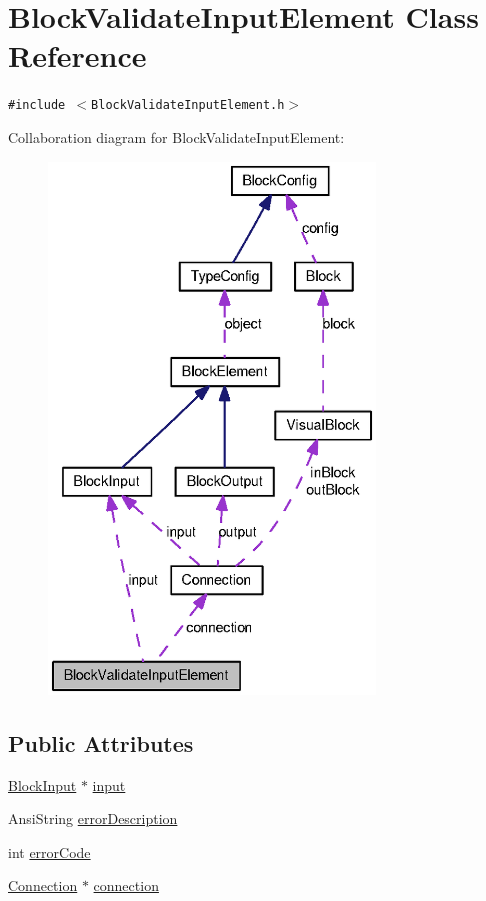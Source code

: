 \hypertarget{classBlockValidateInputElement}{
\section{BlockValidateInputElement Class Reference}
\label{classBlockValidateInputElement}
}
{\tt \#include $<$BlockValidateInputElement.h$>$}

Collaboration diagram for BlockValidateInputElement:\nopagebreak
\begin{figure}[H]
\begin{center}
\leavevmode
\includegraphics[height=400pt]{classBlockValidateInputElement__coll__graph}
\end{center}
\end{figure}
\subsection*{Public Attributes}
\begin{CompactItemize}
\item 
\hyperlink{classBlockInput}{BlockInput} $\ast$ \hyperlink{classBlockValidateInputElement_26eb9998699990af1bd5c37d0c349756}{input}
\item 
AnsiString \hyperlink{classBlockValidateInputElement_fde55132868604704517be802a6d49d6}{errorDescription}
\item 
int \hyperlink{classBlockValidateInputElement_4bfede90be866e8bfdda42c48ef54153}{errorCode}
\item 
\hyperlink{classConnection}{Connection} $\ast$ \hyperlink{classBlockValidateInputElement_fc5b397cb97ff9fe22948a97b3b782d1}{connection}
\end{CompactItemize}



